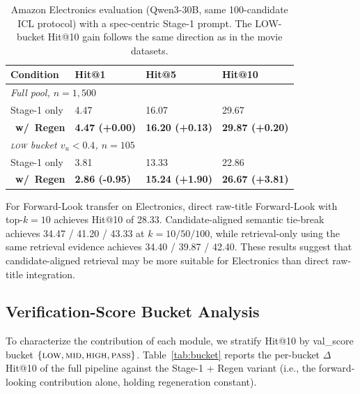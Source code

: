 \documentclass[11pt]{article}
\begin{document}
\begin{table}[!t]
\centering
\small
\begin{tabularx}{\linewidth}{llll}
\toprule
\textbf{Condition} & \textbf{Hit@1} & \textbf{Hit@5} & \textbf{Hit@10} \\
\midrule
\multicolumn{4}{l}{\emph{Full pool, $n{=}1{,}500$}} \\
Stage-1 only       &  4.47 & 16.07 & 29.67 \\
\rowcolor{yellow!30}
~\textbf{w/~Regen}           &  \textbf{4.47 {\scriptsize(+0.00)}} & \textbf{16.20 {\scriptsize(+0.13)}} & \textbf{29.87 {\scriptsize(+0.20)}}\\
\midrule
\multicolumn{4}{l}{\emph{\textsc{low} bucket $v_u{<}0.4$, $n{=}105$}} \\
Stage-1 only       &  3.81 & 13.33 & 22.86 \\
\rowcolor{yellow!30}
~\textbf{w/~Regen}           &  \textbf{2.86 {\scriptsize(-0.95)}} & \textbf{15.24 {\scriptsize(+1.90)}} & \textbf{26.67 {\scriptsize(+3.81)}} \\
\bottomrule
\end{tabularx}
\caption{Amazon Electronics evaluation (Qwen3-30B, same 100-candidate ICL protocol) with a spec-centric Stage-1 prompt. The LOW-bucket Hit@10 gain follows the same direction as in the movie datasets.}
\label{tab:elec}
\end{table}

For Forward-Look transfer on Electronics, direct raw-title Forward-Look with top-$k{=}10$ achieves Hit@10 of 28.33. Candidate-aligned semantic tie-break achieves 34.47 / 41.20 / 43.33 at $k{=}10/50/100$, while retrieval-only using the same retrieval evidence achieves 34.40 / 39.87 / 42.40. These results suggest that candidate-aligned retrieval may be more suitable for Electronics than direct raw-title integration.

\subsection{Verification-Score Bucket Analysis}
\label{sec:bucket}
To characterize the contribution of each module, we stratify Hit@10 by val\_score bucket $\{\textsc{low}, \textsc{mid}, \textsc{high}, \textsc{pass}\}$. Table~\ref{tab:bucket} reports the per-bucket $\Delta$Hit@10 of the full pipeline against the Stage-1 + Regen variant (i.e., the forward-looking contribution alone, holding regeneration constant).
\end{document}
